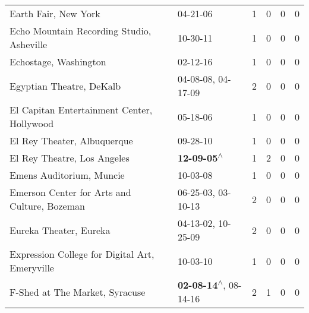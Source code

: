 \begin{supertabular}{p{0.4\textwidth}p{0.3\textwidth}p{0.05\textwidth}p{0.05\textwidth}p{0.05\textwidth}p{0.05\textwidth}}
                                                         Earth Fair, New York &                                                                  04-21-06\textsuperscript{} &  1 &  0 &  0 &  0 \\
                                    Echo Mountain Recording Studio, Asheville &                                                                  10-30-11\textsuperscript{} &  1 &  0 &  0 &  0 \\
                                                        Echostage, Washington &                                                                  02-12-16\textsuperscript{} &  1 &  0 &  0 &  0 \\
                                                     Egyptian Theatre, DeKalb &                                      04-08-08\textsuperscript{}, 04-17-09\textsuperscript{} &  2 &  0 &  0 &  0 \\
                                   El Capitan Entertainment Center, Hollywood &                                                                  05-18-06\textsuperscript{} &  1 &  0 &  0 &  0 \\
                                                  El Rey Theater, Albuquerque &                                                                  09-28-10\textsuperscript{} &  1 &  0 &  0 &  0 \\
                                                  El Rey Theatre, Los Angeles &                                                 \textbf{12-09-05\textsuperscript{$\wedge$}} &  1 &  2 &  0 &  0 \\
                                                     Emens Auditorium, Muncie &                                                                  10-03-08\textsuperscript{} &  1 &  0 &  0 &  0 \\
                                 Emerson Center for Arts and Culture, Bozeman &                                      06-25-03\textsuperscript{}, 03-10-13\textsuperscript{} &  2 &  0 &  0 &  0 \\
                                                       Eureka Theater, Eureka &                                      04-13-02\textsuperscript{}, 10-25-09\textsuperscript{} &  2 &  0 &  0 &  0 \\
                               Expression College for Digital Art, Emeryville &                                                                  10-03-10\textsuperscript{} &  1 &  0 &  0 &  0 \\
                                               F-Shed at The Market, Syracuse &                     \textbf{02-08-14\textsuperscript{$\wedge$}}, 08-14-16\textsuperscript{} &  2 &  1 &  0 &  0 \\

\end{supertabular}
